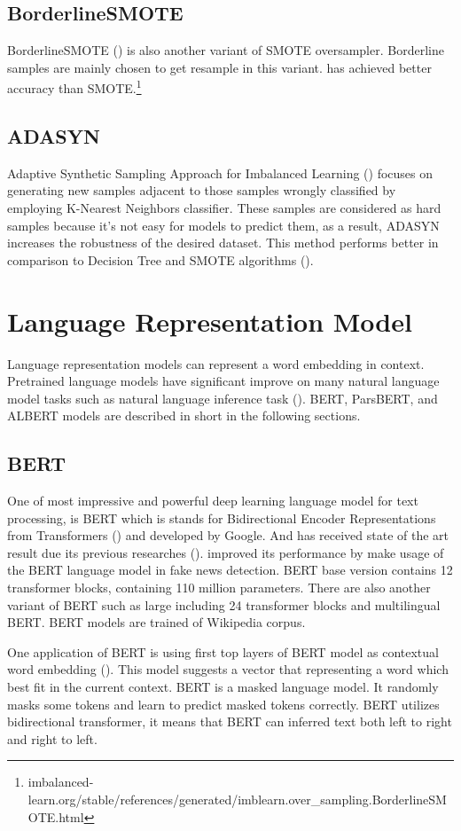 \subsection{BorderlineSMOTE} 
BorderlineSMOTE (\cite{borderlinesmothe}) is also another variant of SMOTE oversampler. Borderline samples are mainly chosen to get resample in this variant. \cite{borderlinesmothe} has achieved better accuracy than SMOTE.\footnote{imbalanced-learn.org/stable/references/generated/imblearn.over\_sampling.BorderlineSMOTE.html}
\subsection{ADASYN} 
Adaptive Synthetic Sampling Approach for Imbalanced Learning (\cite{adasyn}) focuses on generating new samples adjacent to those samples wrongly classified by employing K-Nearest Neighbors classifier. These samples are considered as hard samples because it's not easy for models to predict them, as a result, ADASYN increases the robustness of the desired dataset. This method performs better in comparison to Decision Tree and SMOTE algorithms (\cite{adasyn}).

\section{Language Representation Model}
\label{lr:lm}
Language representation models can represent a word embedding in context. Pretrained language models have significant improve on many natural language model tasks such as natural language inference task (\cite{bert}). BERT, ParsBERT, and ALBERT models are described in short in the following sections.
\subsection{BERT}
One of most impressive and powerful deep learning language model for text processing, is BERT which is stands for Bidirectional Encoder
Representations from Transformers (\cite{bert}) and developed by Google. And has received state of the art result due its previous researches (\cite{bert}). \cite{spotfake} improved its performance by make usage of the BERT language model in fake news detection. BERT base version contains 12 transformer blocks, containing 110 million parameters. There are also another variant of BERT such as large including 24 transformer blocks and multilingual BERT. BERT models are trained of Wikipedia corpus. 

One application of BERT is using first top layers of BERT model as contextual word embedding (\cite{book_datafake}). This model suggests a vector that representing a word which best fit in the current context.  BERT is a masked language model. It randomly masks some tokens and learn to predict masked tokens correctly. BERT utilizes bidirectional transformer, it means that BERT can inferred text both left to right and right to left.

